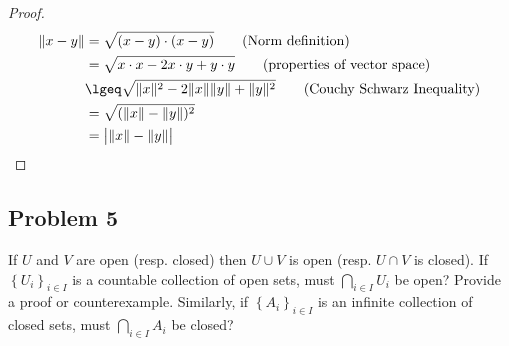 \documentclass[11pt]{article}
\begin{document}
\begin{proof}
  $ $\\
  \begin{align*}
    \| x-y \| &= \sqrt{(x-y)\cdot (x-y)} \tag{Norm definition} \\
    &= \sqrt{x\cdot x -2x\cdot y + y\cdot y}     \tag{properties of vector space}\\
    &\lgeq \sqrt{\| x \|^2 - 2\|x\| \|y\| + \|y\|^2} \tag{Couchy Schwarz Inequality} \\
    &= \sqrt{(\|x\|-\|y\|)^2} \\
    &= \big\vert \|x \| - \|y \| \big\vert
  \end{align*}
\end{proof}


\subsection*{Problem 5}

If $U$ and $V$ are open (resp. closed) then $U\cup V$ is open (resp. $U\cap V$ is closed). If $\left\{U_{i}\right\}_{i\in I}$ is a countable collection of open sets, must $\bigcap_{i\in I}U_i$ be open? Provide a proof or counterexample. Similarly, if $\left\{A_{i}\right\}_{i\in I}$ is an infinite collection of closed sets, must $\bigcap_{i\in I}A_i$ be closed?
\end{document}

